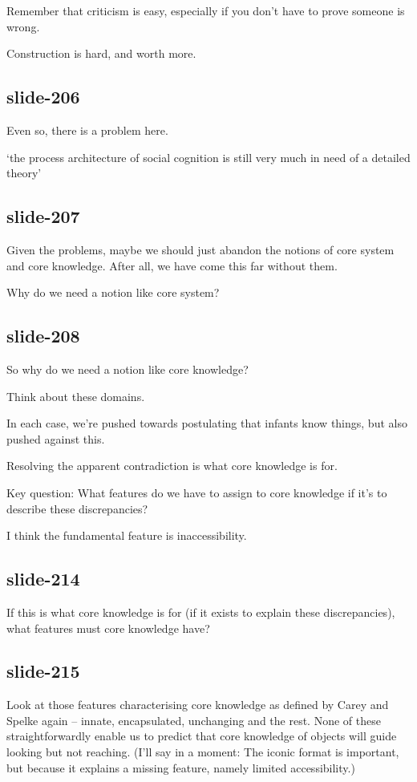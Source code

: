\documentclass[12pt,\papersize]{extarticle}
\begin{document}
Remember that criticism is easy, especially if you don't have to prove someone is wrong.
 
Construction is hard, and worth more.
 
\subsection{slide-206}
Even so, there is a problem here.
 
‘the process architecture of social cognition is still very much in need of a detailed theory’
\citep[p.\ 759]{adolphs_conceptual_2010}
 
\subsection{slide-207}
Given the problems, maybe we should just abandon the notions of core system and core knowledge.
After all, we have come this far without them.
 
Why do we need a notion like core system?
 
\subsection{slide-208}
So why do we need a notion like core knowledge?
 
Think about these domains.
 
In each case, we're pushed towards postulating that infants know things, but also pushed against this.
 
Resolving the apparent contradiction is what core knowledge is for.
 
Key question: What features do we have to assign to core knowledge if it's to describe these discrepancies?
 
I think the fundamental feature is inaccessibility.
 
\subsection{slide-214}
If this is what core knowledge is for (if it exists to explain these discrepancies), what features must core knowledge have?
 
\subsection{slide-215}
Look at those features characterising core knowledge as defined by Carey and Spelke again
-- innate, encapsulated, unchanging and the rest.
None of these straightforwardly enable us to predict that core knowledge of objects will 
guide looking but not reaching.
(I'll say in a moment: 
The iconic format is important, but because it explains a missing feature, namely limited
accessibility.)
 
\end{document}
